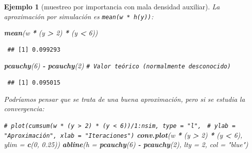 \documentclass[
  spanish,
  10pt,
]{book}
\newenvironment{Shaded}{\begin{snugshade}}{\end{snugshade}}
\newcommand{\AttributeTok}[1]{\textcolor[rgb]{0.13,0.29,0.53}{#1}}
\newcommand{\CommentTok}[1]{\textcolor[rgb]{0.56,0.35,0.01}{\textit{#1}}}
\newcommand{\DecValTok}[1]{\textcolor[rgb]{0.00,0.00,0.81}{#1}}
\newcommand{\FloatTok}[1]{\textcolor[rgb]{0.00,0.00,0.81}{#1}}
\newcommand{\FunctionTok}[1]{\textcolor[rgb]{0.13,0.29,0.53}{\textbf{#1}}}
\newcommand{\NormalTok}[1]{#1}
\newcommand{\SpecialCharTok}[1]{\textcolor[rgb]{0.81,0.36,0.00}{\textbf{#1}}}
\newcommand{\StringTok}[1]{\textcolor[rgb]{0.31,0.60,0.02}{#1}}
\theoremstyle{break}
\newtheorem{example}{Ejemplo}[chapter]
\theoremstyle{nonumberplain}
\renewcommand{\CommentTok}[1]{\textcolor[rgb]{0.41,0.41,0.41}{\texttt{#1}}}
\begin{document}
\begin{example}[muestreo por importancia con mala densidad auxiliar]
La aproximación por simulación es \texttt{mean(w\ *\ h(y))}:

\begin{Shaded}
\begin{Highlighting}[]
\FunctionTok{mean}\NormalTok{(w }\SpecialCharTok{*}\NormalTok{ (y }\SpecialCharTok{\textgreater{}} \DecValTok{2}\NormalTok{) }\SpecialCharTok{*}\NormalTok{ (y }\SpecialCharTok{\textless{}} \DecValTok{6}\NormalTok{)) }
\end{Highlighting}
\end{Shaded}

\begin{verbatim}
 ## [1] 0.099293
\end{verbatim}

\begin{Shaded}
\begin{Highlighting}[]
\FunctionTok{pcauchy}\NormalTok{(}\DecValTok{6}\NormalTok{) }\SpecialCharTok{{-}} \FunctionTok{pcauchy}\NormalTok{(}\DecValTok{2}\NormalTok{)  }\CommentTok{\# Valor teórico (normalmente desconocido)}
\end{Highlighting}
\end{Shaded}

\begin{verbatim}
 ## [1] 0.095015
\end{verbatim}

Podríamos pensar que se trata de una buena aproximación, pero si se estudia la convergencia:

\begin{Shaded}
\begin{Highlighting}[]
\CommentTok{\# plot(cumsum(w * (y \textgreater{} 2) * (y \textless{} 6))/1:nsim, type = "l", }
\CommentTok{\#      ylab = "Aproximación", xlab = "Iteraciones")}
\FunctionTok{conv.plot}\NormalTok{(w }\SpecialCharTok{*}\NormalTok{ (y }\SpecialCharTok{\textgreater{}} \DecValTok{2}\NormalTok{) }\SpecialCharTok{*}\NormalTok{ (y }\SpecialCharTok{\textless{}} \DecValTok{6}\NormalTok{), }\AttributeTok{ylim =} \FunctionTok{c}\NormalTok{(}\DecValTok{0}\NormalTok{, }\FloatTok{0.25}\NormalTok{))}
\FunctionTok{abline}\NormalTok{(}\AttributeTok{h =} \FunctionTok{pcauchy}\NormalTok{(}\DecValTok{6}\NormalTok{) }\SpecialCharTok{{-}} \FunctionTok{pcauchy}\NormalTok{(}\DecValTok{2}\NormalTok{), }\AttributeTok{lty =} \DecValTok{2}\NormalTok{, }\AttributeTok{col =} \StringTok{"blue"}\NormalTok{)}
\end{Highlighting}
\end{Shaded}

\begin{figure}[!htbp]


\end{figure}
\end{example}
\end{document}
